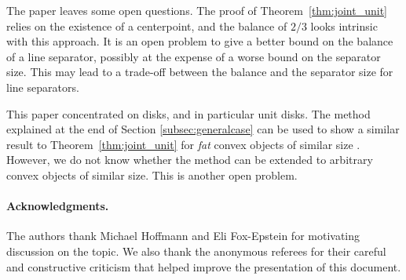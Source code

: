 \documentclass{llncs}
\begin{document}
The paper leaves some open questions.
The proof of Theorem~\ref{thm:joint_unit} relies on the existence 
of a centerpoint, 
and the balance of $2/3$ looks intrinsic with this approach.
It is an open problem to give a better bound on the balance
of a line separator,
possibly at the expense of a worse bound on the separator size.
This may lead to a trade-off between
the balance and the separator size for line separators.


This paper concentrated on disks, and in particular unit disks.
The method explained at the end of Section \ref{subsec:generalcase}
can be used to show a similar result to Theorem~\ref{thm:joint_unit}
for \emph{fat} convex objects of similar size \cite{DBLP:journals/algorithmica/BergSVK02}.
However, we do not know whether the method can be extended to arbitrary convex objects of similar size.
This is another open problem.

\paragraph{Acknowledgments.}

The authors thank Michael Hoffmann and Eli Fox-Epstein for 
motivating discussion on the topic.
We also thank the anonymous referees for their careful and constructive criticism that helped improve the presentation of this document.



\end{document}
